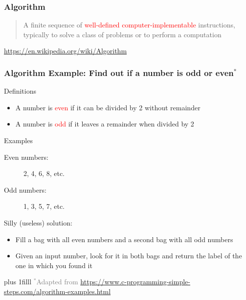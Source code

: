 \documentclass{beamer}
\newcommand{\btVFill}{\vskip0pt plus 1filll}
\newcommand{\light}[1]{\textcolor{gray}{#1}}
\newcommand{\red}[1]{\textcolor{red}{#1}}
\begin{document}
\begin{frame}
\frametitle{Algorithm}

\begin{quote}
 A finite sequence of \red{well-defined computer-implementable} instructions, 
typically to solve a class of problems or to perform a computation
\end{quote}
\begin{flushright}
\footnotesize
 \light{\url{https://en.wikipedia.org/wiki/Algorithm}}
\end{flushright}
\end{frame}

\begin{frame}
\frametitle{Algorithm Example: Find out if a number is odd or 
even$^*$}
\pause 

\alert{Definitions}

\begin{itemize}
 \item A number is \red{even} if it can be divided by 2 without remainder
 \item A number is \red{odd} if it leaves a remainder when divided by 2
\end{itemize}				\pause 

\alert{Examples}

\begin{description}
 \item[Even numbers:] 2, 4, 6, 8, etc. 
 \item[Odd numbers:] 1, 3, 5, 7, etc.
\end{description}			\pause 

\alert{Silly (useless) solution:}

\begin{itemize}
 \item Fill a bag with all even numbers and a second bag with all odd numbers
 \item Given an input number, look for it in both bags and return the label of 
the one in which you found it
\end{itemize}	

\btVFill
\onslide
\footnotesize
\light{$^*$Adapted from 
\url{https://www.c-programming-simple-steps.com/algorithm-examples.html}}
\end{frame}
\end{document}
